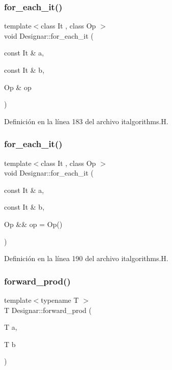 \subsubsection{\texorpdfstring{for\+\_\+each\+\_\+it()}{for\_each\_it()}\hspace{0.1cm}{\footnotesize\ttfamily [1/2]}}
{\footnotesize\ttfamily template$<$class It , class Op $>$ \\
void Designar\+::for\+\_\+each\+\_\+it (\begin{DoxyParamCaption}\item[{const It \&}]{a,  }\item[{const It \&}]{b,  }\item[{Op \&}]{op }\end{DoxyParamCaption})}



Definición en la línea 183 del archivo italgorithms.\+H.

\mbox{\label{namespace_designar_a773f2843935a2d490b202240480d9e86}} 
\subsubsection{\texorpdfstring{for\+\_\+each\+\_\+it()}{for\_each\_it()}\hspace{0.1cm}{\footnotesize\ttfamily [2/2]}}
{\footnotesize\ttfamily template$<$class It , class Op $>$ \\
void Designar\+::for\+\_\+each\+\_\+it (\begin{DoxyParamCaption}\item[{const It \&}]{a,  }\item[{const It \&}]{b,  }\item[{Op \&\&}]{op = {\ttfamily Op()} }\end{DoxyParamCaption})}



Definición en la línea 190 del archivo italgorithms.\+H.

\mbox{\label{namespace_designar_a38bdfe24d16d5f665e10d75834cded69}} 
\subsubsection{\texorpdfstring{forward\+\_\+prod()}{forward\_prod()}}
{\footnotesize\ttfamily template$<$typename T $>$ \\
T Designar\+::forward\+\_\+prod (\begin{DoxyParamCaption}\item[{T}]{a,  }\item[{T}]{b }\end{DoxyParamCaption})}



